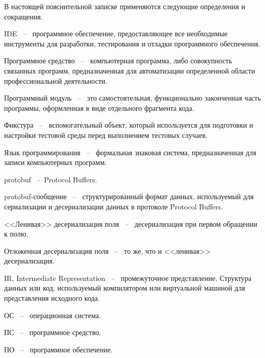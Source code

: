 
В настоящей пояснительной записке применяются следующие
определения и сокращения.

IDE ~--~ программное обеспечение, предоставляющее все необходимые
инструменты для разработки, тестирования и отладки программного
обеспечения.

Программное средство ~--~ компьютерная программа, либо совокупность
связанных программ, предназначенная для автоматизации определенной
области профессиональной деятельности.

Программный модуль ~--~ это самостоятельная, функционально законченная часть программы, оформленная в виде отдельного фрагмента кода.

Фикстура ~--~ вспомогательный объект, который используется для подготовки и настройки тестовой среды перед выполнением тестовых случаев.

Язык программирования ~--~ формальная знаковая система,
предназначенная для записи компьютерных программ.

protobuf ~--~Protocol Buffers.

protobuf-сообщение ~--~ структурированный формат данных, используемый для сериализации и десериализации данных в протоколе Protocol Buffers.

<<Ленивая>> десериализация поля ~--~ десериализация при первом обращении к полю.

Отложенная десериализация поля ~--~ то же, что и <<ленивая>> десериализация.

IR, Intermediate Representation ~--~ промежуточное представление. Структура данных или код, используемый компилятором или виртуальной машиной для представления исходного кода.

ОС ~--~ операционная система.

ПС ~--~ программное средство.

ПО ~--~ программное обеспечение.

\pagebreak
